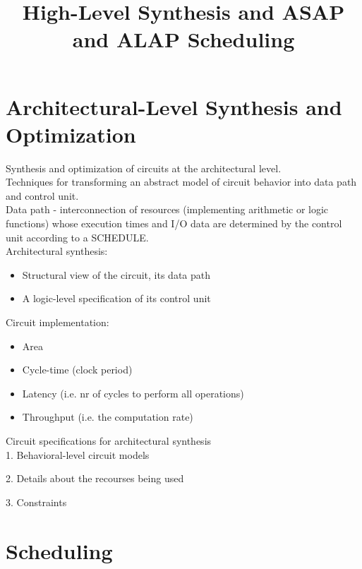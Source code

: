 \documentclass[12pt]{article}
\begin{document}
\title{High-Level Synthesis and ASAP and ALAP Scheduling}
\maketitle

\section{Architectural-Level Synthesis and Optimization}


Synthesis and optimization of circuits at the architectural level.\\

Techniques for transforming an abstract model of circuit behavior into data path and control unit.\\

Data path - interconnection of resources (implementing arithmetic or logic functions) whose execution times and I/O data are determined by the control unit according to a SCHEDULE.\\

Architectural synthesis:

\begin{itemize}
  \item Structural view of the circuit, its data path
  \item A logic-level specification of its control unit\\
\end{itemize}

Circuit implementation:
\begin{itemize}

  \item Area
  \item Cycle-time (clock period)
  \item Latency (i.e. nr of cycles to perform all operations)
  \item Throughput (i.e. the computation rate)\\
\end{itemize}

Circuit specifications for architectural synthesis\\

1. Behavioral-level circuit models

2. Details about the recourses being used

3. Constraints

\section{Scheduling}
\end{document}
